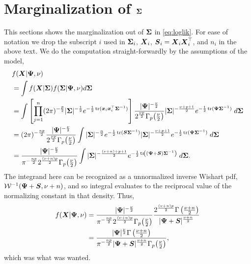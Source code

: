 \documentclass{article}\usepackage[]{graphicx}\usepackage[]{color}
\begin{document}
\section[Marginalization of Sigma]{Marginalization of ${\boldsymbol{\Sigma}}$}
\label{sec:marginalization}
This sections shows the marginalization out of ${\boldsymbol{\Sigma}}$ in \eqref{eq:loglik}. For ease of notation we drop the subscript $i$ used in ${\boldsymbol{\Sigma}}_i$, ${\boldsymbol{X}}_i$, ${\boldsymbol{S}}_i = {\boldsymbol{X}}_i {\boldsymbol{X}}_i^\top$, and $n_i$ in the above text. We do the computation straight-forwardly by the assumptions of the model,
\small
\begin{align*}
  &f({\boldsymbol{X}} | {\boldsymbol{\Psi}}, \nu) \\
  &= \int f({\boldsymbol{X}}|{\boldsymbol{\Sigma}}) f({\boldsymbol{\Sigma}} | {\boldsymbol{\Psi}}, \nu) d{\boldsymbol{\Sigma}} \\
  &= \int \left[ \prod_{j = 1}^n  (2\pi)^{-\frac{p}{2}} |{\boldsymbol{\Sigma}}|^{-\frac{1}{2}}
                         e^{-\frac{1}{2}\operatorname*{tr}({\boldsymbol{x}}_i{\boldsymbol{x}}_i^\top{\boldsymbol{\Sigma}}^{-1})} \right]
          \frac{|{\boldsymbol{\Psi}}|^{-\frac{\nu}{2}}}{2^{\frac{\nu p}{2}}\Gamma_p\!\left(\frac{\nu}{2}\right)}
          |{\boldsymbol{\Sigma}}|^{-\frac{\nu+p+1}{2}}e^{-\frac{1}{2}\operatorname*{tr}({\boldsymbol{\Psi}}{\boldsymbol{\Sigma}}^{-1})}
      \;d{\boldsymbol{\Sigma}} \\
  &= (2\pi)^{-\frac{np}{2}}
      \frac{|{\boldsymbol{\Psi}}|^{-\frac{\nu}{2}}}{2^{\frac{\nu p}{2}}\Gamma_p\!\left(\frac{\nu}{2}\right)}
      \int
        |{\boldsymbol{\Sigma}}|^{-\frac{n}{2}}  e^{-\frac{1}{2}\operatorname*{tr}({\boldsymbol{S}}{\boldsymbol{\Sigma}}^{-1})}
        |{\boldsymbol{\Sigma}}|^{-\frac{\nu+p+1}{2}} e^{-\frac{1}{2}\operatorname*{tr}({\boldsymbol{\Psi}}{\boldsymbol{\Sigma}}^{-1})}
      \;d{\boldsymbol{\Sigma}} \\
  &=
      \frac{|{\boldsymbol{\Psi}}|^{-\frac{\nu}{2}}}{\pi^{-\frac{np}{2}}2^{\frac{(\nu + n) p}{2}}\Gamma_p\!\left(\frac{\nu}{2}\right)}
      \int
        |{\boldsymbol{\Sigma}}|^{-\frac{(\nu + n)+p+1}{2}}
         e^{-\frac{1}{2}\operatorname*{tr}\!\left(({\boldsymbol{\Psi}}+ {\boldsymbol{S}}){\boldsymbol{\Sigma}}^{-1}\right)}
      \;d{\boldsymbol{\Sigma}}.
\end{align*}
\normalsize
The integrand here can be recognized as a unnormalized inverse Wishart pdf,  $\mathcal{W}^{-1}({\boldsymbol{\Psi}} + {\boldsymbol{S}}, \nu + n)$, and so integral evaluates to the reciprocal value of the normalizing constant in that density. Thus,
\begin{align*}
  f({\boldsymbol{X}} | {\boldsymbol{\Psi}}, \nu)
  &=
    \frac{|{\boldsymbol{\Psi}}|^{-\frac{\nu}{2}}}
         {\pi^{-\frac{np}{2}} 2^{\frac{(\nu + n) p}{2} } \Gamma_p\!\left(\frac{\nu}{2}\right)}
    \frac{2^\frac{(v+n)p}{2} \Gamma\left(\frac{\nu + n}{2}\right)}
         {|{\boldsymbol{\Psi}} + {\boldsymbol{S}}|^{\frac{\nu + n}{2}}} \\
  &=
    \frac{|{\boldsymbol{\Psi}}|^\frac{\nu}{2} \Gamma\left(\frac{\nu + n}{2}\right)}
         {\pi^{-\frac{np}{2}} |{\boldsymbol{\Psi}} + {\boldsymbol{S}}|^{\frac{\nu + n}{2}}\Gamma_p\!\left(\frac{\nu}{2}\right)},
\end{align*}
which was what was wanted.
\end{document}
